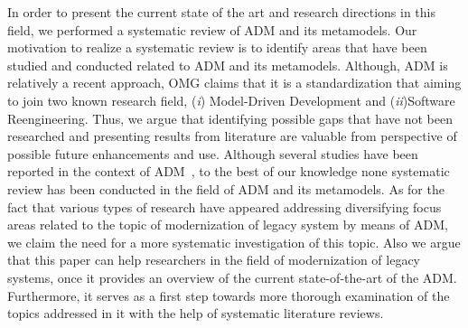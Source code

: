 In order to  present the current state of the art and research directions in this field, we performed a systematic review of ADM and its metamodels. Our motivation to realize a systematic review is to identify areas that have been studied and conducted related to ADM and its metamodels. Although, ADM is relatively a recent approach, OMG claims that it is a standardization that aiming to join two known research field, (\textit{i}) Model-Driven Development and (\textit{ii})Software Reengineering. Thus, we argue that identifying possible gaps that have not been researched and presenting results from literature are valuable from perspective of possible future enhancements and use.  Although several studies have been reported in the context of ADM~\cite{PerezCastillo20121370, SMR:SMR582, FuentesFernandez2012247, PrezCastillo2011519}, to the best of our knowledge none systematic review has been conducted in the field of ADM and its metamodels. As for the fact that various types of research have appeared addressing diversifying focus areas related to the topic of modernization of legacy system by means of ADM, we claim the need for a more systematic investigation of this topic. Also we argue that this paper can help researchers in the field of modernization of legacy systems, once it provides an overview of the current state-of-the-art of the ADM. Furthermore, it serves as a first step towards more thorough examination of the topics addressed in it with the help of systematic literature reviews.






